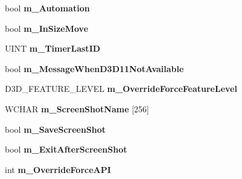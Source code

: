 \begin{DoxyCompactItemize}
\item 
\hypertarget{struct_d_x_u_t_state_1_1_s_t_a_t_e_a7f0689204ca27a9a3ef94a4713eebbd5}{bool {\bfseries m\+\_\+\+Automation}}\label{struct_d_x_u_t_state_1_1_s_t_a_t_e_a7f0689204ca27a9a3ef94a4713eebbd5}

\item 
\hypertarget{struct_d_x_u_t_state_1_1_s_t_a_t_e_ae0574477ea8dcdc926d419b7525fb86c}{bool {\bfseries m\+\_\+\+In\+Size\+Move}}\label{struct_d_x_u_t_state_1_1_s_t_a_t_e_ae0574477ea8dcdc926d419b7525fb86c}

\item 
\hypertarget{struct_d_x_u_t_state_1_1_s_t_a_t_e_a4ac1c84ee64b88305935da70d01fb1af}{U\+I\+N\+T {\bfseries m\+\_\+\+Timer\+Last\+I\+D}}\label{struct_d_x_u_t_state_1_1_s_t_a_t_e_a4ac1c84ee64b88305935da70d01fb1af}

\item 
\hypertarget{struct_d_x_u_t_state_1_1_s_t_a_t_e_a15be7f4376f02a7dc685979183ec81db}{bool {\bfseries m\+\_\+\+Message\+When\+D3\+D11\+Not\+Available}}\label{struct_d_x_u_t_state_1_1_s_t_a_t_e_a15be7f4376f02a7dc685979183ec81db}

\item 
\hypertarget{struct_d_x_u_t_state_1_1_s_t_a_t_e_aff32d993a82bc62612b732be30fe51d0}{D3\+D\+\_\+\+F\+E\+A\+T\+U\+R\+E\+\_\+\+L\+E\+V\+E\+L {\bfseries m\+\_\+\+Override\+Force\+Feature\+Level}}\label{struct_d_x_u_t_state_1_1_s_t_a_t_e_aff32d993a82bc62612b732be30fe51d0}

\item 
\hypertarget{struct_d_x_u_t_state_1_1_s_t_a_t_e_aa1ff4435afc796fa21990f447cd2c48d}{W\+C\+H\+A\+R {\bfseries m\+\_\+\+Screen\+Shot\+Name} \mbox{[}256\mbox{]}}\label{struct_d_x_u_t_state_1_1_s_t_a_t_e_aa1ff4435afc796fa21990f447cd2c48d}

\item 
\hypertarget{struct_d_x_u_t_state_1_1_s_t_a_t_e_a04a38ad99b41d42785ed4c48bc2997af}{bool {\bfseries m\+\_\+\+Save\+Screen\+Shot}}\label{struct_d_x_u_t_state_1_1_s_t_a_t_e_a04a38ad99b41d42785ed4c48bc2997af}

\item 
\hypertarget{struct_d_x_u_t_state_1_1_s_t_a_t_e_aea2d0a1f295cc84e839989e850676dc6}{bool {\bfseries m\+\_\+\+Exit\+After\+Screen\+Shot}}\label{struct_d_x_u_t_state_1_1_s_t_a_t_e_aea2d0a1f295cc84e839989e850676dc6}

\item 
\hypertarget{struct_d_x_u_t_state_1_1_s_t_a_t_e_abbd8ce1e0bde64089f489c6cdad0da3e}{int {\bfseries m\+\_\+\+Override\+Force\+A\+P\+I}}\label{struct_d_x_u_t_state_1_1_s_t_a_t_e_abbd8ce1e0bde64089f489c6cdad0da3e}


\end{DoxyCompactItemize}
